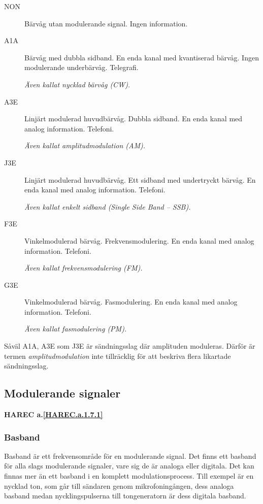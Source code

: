 \begin{description}
\item[NON] Bärvåg utan modulerande signal. Ingen information.

\item[A1A] Bärvåg med dubbla sidband. En enda kanal med kvantiserad bärvåg.
Ingen modulerande underbärvåg. Telegrafi.

\emph{Även kallat nycklad bärvåg (CW).}

\item[A3E] Linjärt modulerad huvudbärvåg. Dubbla sidband. En enda kanal med
analog information. Telefoni.

\emph{Även kallat amplitudmodulation (AM).}

\item[J3E] Linjärt modulerad huvudbärvåg. Ett sidband med undertryckt bärvåg.
En enda kanal med analog information. Telefoni.

\emph{Även kallat enkelt sidband (Single Side Band -- SSB).}

\item[F3E] Vinkelmodulerad bärvåg. Frekvensmodulering. En enda kanal med analog
information. Telefoni.

\emph{Även kallat frekvensmodulering (FM).}

\item[G3E] Vinkelmodulerad bärvåg. Fasmodulering. En enda kanal med analog
information. Telefoni.

\emph{Även kallat fasmodulering (PM).}
\end{description}

Såväl A1A, A3E som J3E är sändningsslag där amplituden moduleras. Därför är
termen \emph{amplitudmodulation} inte tillräcklig för att beskriva flera
likartade sändningsslag.

\subsection{Modulerande signaler}
\textbf{HAREC a.\ref{HAREC.a.1.7.1}\label{myHAREC.a.1.7.1}}

\subsubsection{Basband}

Basband är ett frekvensområde för en modulerande signal. Det finns ett basband
för alla slags modulerande signaler, vare sig de är analoga eller digitala. Det
kan finnas mer än ett basband i en komplett modulationsprocess. Till exempel är
en nycklad ton, som går till sändaren genom mikrofoningången, dess analoga
basband medan nycklingspulserna till tongeneratorn är dess digitala basband.

